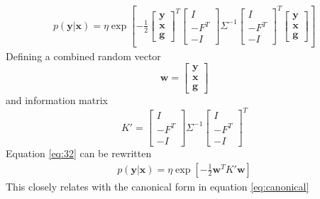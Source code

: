 \documentclass[12pt,oneside,openany,a4paper, %
afrikaans,english,
]{memoir}
\numberwithin{equation}{chapter}
\begin{document}
\begin{equation}
\label{eq:32}
\begin{split}
p(\bm{y}|\bm{x}) = \eta\exp\left[-\frac{1}{2}
\begin{bmatrix}
\bm{y}\\
\bm{x}\\
\bm{g}
\end{bmatrix}^T
\begin{bmatrix}
I\\-F^T\\-I
\end{bmatrix}
\Sigma^{-1}
\begin{bmatrix}
I\\-F^T\\-I
\end{bmatrix}^T
\begin{bmatrix}
\bm{y}\\
\bm{x}\\
\bm{g}
\end{bmatrix}
\right]
\end{split}
\end{equation}
Defining a combined random vector
\begin{equation}
\bm{w} = 
\begin{bmatrix}
\bm{y}\\
\bm{x}\\
\bm{g}

\end{bmatrix}
\end{equation}
and information matrix
\begin{equation}
K' =
\begin{bmatrix}
I\\-F^T\\-I
\end{bmatrix}
\Sigma^{-1}
\begin{bmatrix}
I\\-F^T\\-I
\end{bmatrix}^T
\end{equation}
Equation \ref{eq:32} can be rewritten
\begin{equation}
\label{eq:35}
\begin{split}
p(\bm{y}|\bm{x}) = \eta\exp\left[-\frac{1}{2}
\bm{w}^T
K'
\bm{w}
\right]
\end{split}
\end{equation}
This closely relates with the canonical form in equation \ref{eq:canonical}
\end{document}
